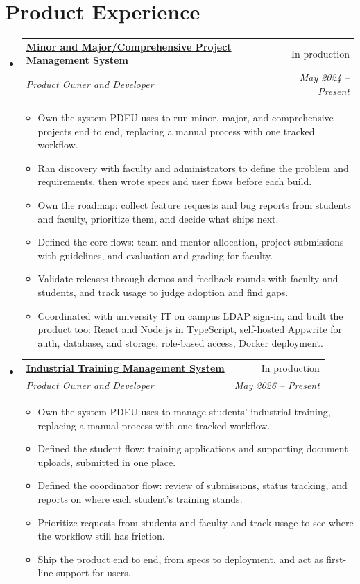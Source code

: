 \documentclass[a4paper,11pt]{article}
\makeatletter
\newcommand{\resumeSubheadingFull}[4]{
  \vspace{-1pt}\item
    \begin{tabular*}{0.97\textwidth}{l@{\extracolsep{\fill}}r}
    \textbf{#1} & #2 \\
    \textit{#3} & \textit{#4} \\
    \end{tabular*}\vspace{-5pt}
}
\newcommand{\resumeSubHeadingListStart}{\begin{itemize}[leftmargin=*]}
\newcommand{\resumeSubHeadingListEnd}{\end{itemize}}
\newcommand{\resumeItemListStart}{\begin{itemize}[itemsep=1pt,topsep=3pt]\small}
\newcommand{\resumeItemListEnd}{\end{itemize}\vspace{-3pt}}
\makeatother
\begin{document}
\section{Product Experience}
  \resumeSubHeadingListStart
    \resumeSubheadingFull{\href{https://portal.pdpu.ac.in}{Minor and Major/Comprehensive Project Management System}}{In production}
      {Product Owner and Developer}{May 2024 -- Present}
      \resumeItemListStart
        \item Own the system PDEU uses to run minor, major, and comprehensive projects end to end, replacing a manual process with one tracked workflow.
        \item Ran discovery with faculty and administrators to define the problem and requirements, then wrote specs and user flows before each build.
        \item Own the roadmap: collect feature requests and bug reports from students and faculty, prioritize them, and decide what ships next.
        \item Defined the core flows: team and mentor allocation, project submissions with guidelines, and evaluation and grading for faculty.
        \item Validate releases through demos and feedback rounds with faculty and students, and track usage to judge adoption and find gaps.
        \item Coordinated with university IT on campus LDAP sign-in, and built the product too: React and Node.js in TypeScript, self-hosted Appwrite for auth, database, and storage, role-based access, Docker deployment.
      \resumeItemListEnd

    \resumeSubheadingFull{\href{https://portal.pdpu.ac.in}{Industrial Training Management System}}{In production}
      {Product Owner and Developer}{May 2026 -- Present}
      \resumeItemListStart
        \item Own the system PDEU uses to manage students' industrial training, replacing a manual process with one tracked workflow.
        \item Defined the student flow: training applications and supporting document uploads, submitted in one place.
        \item Defined the coordinator flow: review of submissions, status tracking, and reports on where each student's training stands.
        \item Prioritize requests from students and faculty and track usage to see where the workflow still has friction.
        \item Ship the product end to end, from specs to deployment, and act as first-line support for users.
      \resumeItemListEnd
  \resumeSubHeadingListEnd
\end{document}
